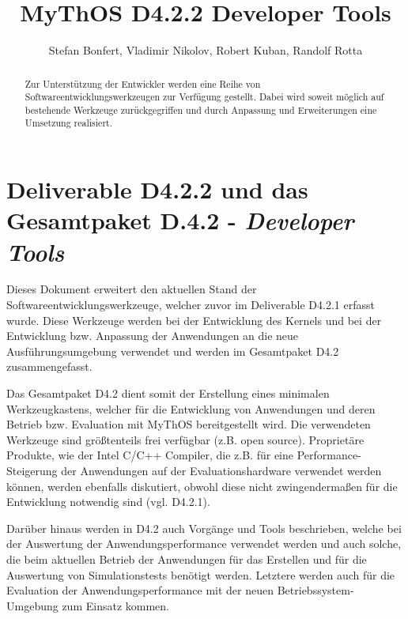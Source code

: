 

\title{MyThOS D4.2.2 Developer Tools}
\author{Stefan Bonfert, Vladimir Nikolov, Robert Kuban, Randolf Rotta}



\maketitle

\begin{abstract}

Zur Unterstützung der Entwickler werden eine Reihe von
Softwareentwicklungswerkzeugen zur Verfügung gestellt. Dabei wird soweit möglich
auf bestehende Werkzeuge zurückgegriffen und durch Anpassung und Erweiterungen
eine Umsetzung realisiert.

\end{abstract}

\newpage
\tableofcontents
\newpage

\section{Deliverable D4.2.2 und das Gesamtpaket D.4.2 - \emph{Developer Tools}}

Dieses Dokument erweitert den aktuellen Stand der Softwareentwicklungswerkzeuge,
welcher zuvor im Deliverable D4.2.1 erfasst wurde.
Diese Werkzeuge werden bei der Entwicklung des Kernels und bei der Entwicklung
bzw. Anpassung der Anwendungen an die neue Ausführungsumgebung verwendet und
werden im Gesamtpaket D4.2 zusammengefasst.

Das Gesamtpaket D4.2 dient somit der Erstellung eines minimalen Werkzeugkastens,
welcher für die Entwicklung von Anwendungen und deren Betrieb bzw. Evaluation
mit MyThOS bereitgestellt wird. Die verwendeten Werkzeuge sind größtenteils frei
verfügbar (z.B. open source). Proprietäre Produkte, wie der Intel C/C++
Compiler, die z.B. für eine Performance-Steigerung der Anwendungen auf der
Evaluationshardware verwendet werden können, werden ebenfalls diskutiert, obwohl
diese nicht zwingendermaßen für die Entwicklung notwendig sind (vgl. D4.2.1).

Darüber hinaus werden in D4.2 auch Vorgänge und Tools beschrieben, welche bei
der Auswertung der Anwendungsperformance verwendet werden und auch solche, die
beim aktuellen Betrieb der Anwendungen für das Erstellen und für die Auswertung
von Simulationstests benötigt werden. Letztere werden auch für die Evaluation
der Anwendungsperformance mit der neuen Betriebssystem-Umgebung zum Einsatz
kommen.

